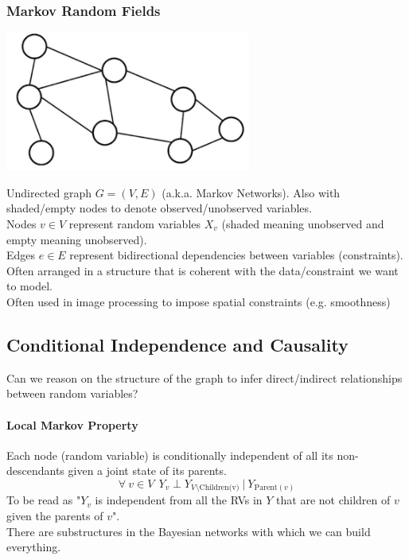 \documentclass[10pt]{report}
\begin{document}
\subsubsection{Markov Random Fields}
\begin{center}
	\includegraphics[scale=0.5]{18.png}
\end{center}
Undirected graph $G = (V,E)$ (a.k.a. Markov Networks). Also with shaded/empty nodes to denote observed/unobserved variables.\\
Nodes $v\in V$ represent random variables $X_v$ (shaded meaning unobserved and empty meaning unobserved).\\
Edges $e\in E$ represent bidirectional dependencies between variables (constraints).\\
Often arranged in a structure that is coherent with the data/constraint we want to model.\\
Often used in image processing to impose spatial constraints (e.g. smoothness)
\subsection{Conditional Independence and Causality}
Can we reason on the structure of the graph to infer direct/indirect relationships between random variables?
\paragraph{Local Markov Property} Each node (random variable) is conditionally independent of all its non-descendants given a joint state of its parents. $$\forall\:v\in V\:\:Y_v\perp Y_{V\setminus \text{Children(v)}}\:|\:Y_{\text{Parent}(v)}$$
To be read as "$Y_v$ is independent from all the RVs in $Y$ that are not children of $v$ given the parents of $v$".\\
There are substructures in the Bayesian networks with which we can build everything.
\end{document}
